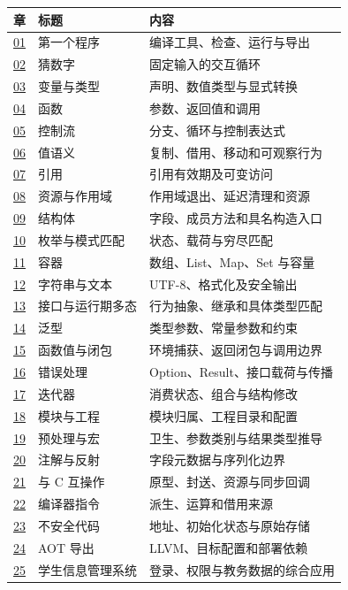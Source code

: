 \begin{center}
\begin{tabular}{lll}
\toprule
章 & 标题 & 内容 \\
\midrule
\hyperref[ch:01]{01} & 第一个程序 & 编译工具、检查、运行与导出 \\
\hyperref[ch:02]{02} & 猜数字 & 固定输入的交互循环 \\
\hyperref[ch:03]{03} & 变量与类型 & 声明、数值类型与显式转换 \\
\hyperref[ch:04]{04} & 函数 & 参数、返回值和调用 \\
\hyperref[ch:05]{05} & 控制流 & 分支、循环与控制表达式 \\
\hyperref[ch:06]{06} & 值语义 & 复制、借用、移动和可观察行为 \\
\hyperref[ch:07]{07} & 引用 & 引用有效期及可变访问 \\
\hyperref[ch:08]{08} & 资源与作用域 & 作用域退出、延迟清理和资源 \\
\hyperref[ch:09]{09} & 结构体 & 字段、成员方法和具名构造入口 \\
\hyperref[ch:10]{10} & 枚举与模式匹配 & 状态、载荷与穷尽匹配 \\
\hyperref[ch:11]{11} & 容器 & 数组、List、Map、Set 与容量 \\
\hyperref[ch:12]{12} & 字符串与文本 & UTF-8、格式化及安全输出 \\
\hyperref[ch:13]{13} & 接口与运行期多态 & 行为抽象、继承和具体类型匹配 \\
\hyperref[ch:14]{14} & 泛型 & 类型参数、常量参数和约束 \\
\hyperref[ch:15]{15} & 函数值与闭包 & 环境捕获、返回闭包与调用边界 \\
\hyperref[ch:16]{16} & 错误处理 & Option、Result、接口载荷与传播 \\
\hyperref[ch:17]{17} & 迭代器 & 消费状态、组合与结构修改 \\
\hyperref[ch:18]{18} & 模块与工程 & 模块归属、工程目录和配置 \\
\hyperref[ch:19]{19} & 预处理与宏 & 卫生、参数类别与结果类型推导 \\
\hyperref[ch:20]{20} & 注解与反射 & 字段元数据与序列化边界 \\
\hyperref[ch:21]{21} & 与 C 互操作 & 原型、封送、资源与同步回调 \\
\hyperref[ch:22]{22} & 编译器指令 & 派生、运算和借用来源 \\
\hyperref[ch:23]{23} & 不安全代码 & 地址、初始化状态与原始存储 \\
\hyperref[ch:24]{24} & AOT 导出 & LLVM、目标配置和部署依赖 \\
\hyperref[ch:25]{25} & 学生信息管理系统 & 登录、权限与教务数据的综合应用 \\
\bottomrule
\end{tabular}
\end{center}

